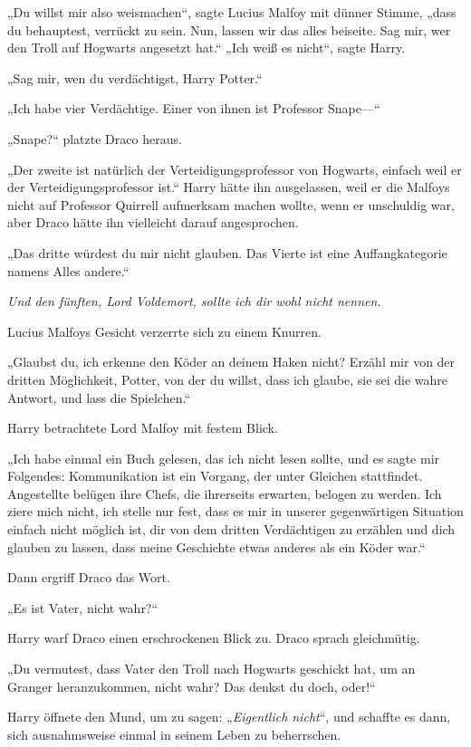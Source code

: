 {„Du willst mir also weismachen“, sagte Lucius Malfoy mit dünner Stimme, „dass du behauptest, verrückt zu sein. Nun, lassen wir das alles beiseite. Sag mir, wer den Troll auf Hogwarts angesetzt hat.“ „Ich weiß es nicht“, sagte Harry.

„Sag mir, wen du verdächtigst, Harry Potter.“

„Ich habe vier Verdächtige. Einer von ihnen ist Professor Snape—“

„Snape?“ platzte Draco heraus.

„Der zweite ist natürlich der Verteidigungsprofessor von Hogwarts, einfach weil er der Verteidigungsprofessor ist.“ Harry hätte ihn ausgelassen, weil er die Malfoys nicht auf Professor Quirrell aufmerksam machen wollte, wenn er unschuldig war, aber Draco hätte ihn vielleicht darauf angesprochen.

„Das dritte würdest du mir nicht glauben. Das Vierte ist eine Auffangkategorie namens Alles andere.“

\emph{Und den fünften, Lord Voldemort, sollte ich dir wohl nicht nennen.}

Lucius Malfoys Gesicht verzerrte sich zu einem Knurren.

„Glaubst du, ich erkenne den Köder an deinem Haken nicht? Erzähl mir von der dritten Möglichkeit, Potter, von der du willst, dass ich glaube, sie sei die wahre Antwort, und lass die Spielchen.“

Harry betrachtete Lord Malfoy mit festem Blick.

„Ich habe einmal ein Buch gelesen, das ich nicht lesen sollte, und es sagte mir Folgendes: Kommunikation ist ein Vorgang, der unter Gleichen stattfindet. Angestellte belügen ihre Chefs, die ihrerseits erwarten, belogen zu werden. Ich ziere mich nicht, ich stelle nur fest, dass es mir in unserer gegenwärtigen Situation einfach nicht möglich ist, dir von dem dritten Verdächtigen zu erzählen und dich glauben zu lassen, dass meine Geschichte etwas anderes als ein Köder war.“

Dann ergriff Draco das Wort.

„Es ist Vater, nicht wahr?“

Harry warf Draco einen erschrockenen Blick zu. Draco sprach gleichmütig.

„Du vermutest, dass Vater den Troll nach Hogwarts geschickt hat, um an Granger heranzukommen, nicht wahr? Das denkst du doch, oder!“

Harry öffnete den Mund, um zu sagen: „\emph{Eigentlich nicht}“, und schaffte es dann, sich ausnahmsweise einmal in seinem Leben zu beherrschen.

}
